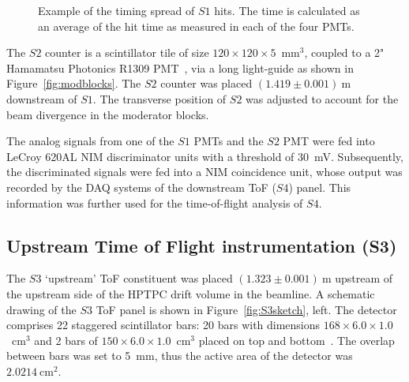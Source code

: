 \begin{figure}
  \begin{adjustbox}{width=0.7\linewidth, center}
    
  \end{adjustbox}
  \caption{Example of the timing spread of $\mathit{S1}$ hits. The time is calculated as an average of the hit time as measured in each of the four PMTs.}
  \label{fig:s1Res}
\end{figure}

The $\mathit{S2}$ counter is a scintillator tile of size $120\times120\times5$~mm$^3$, coupled to a 2" Hamamatsu Photonics R1309 PMT~\cite{Hamamatsu}, via a long light-guide as shown in Figure~\ref{fig:modblocks}.
The $\mathit{S2}$ counter was placed $(1.419 \pm 0.001)~\text{m}$ downstream of $\mathit{S1}$.
The transverse position of $\mathit{S2}$ was adjusted to account for the beam divergence in the moderator blocks.

The analog signals from one of the $\mathit{S1}$ PMTs and the $\mathit{S2}$ PMT were fed into LeCroy 620AL NIM discriminator units with a threshold of 30~mV.
Subsequently, the discriminated signals were fed into a NIM coincidence unit, whose output was recorded by the DAQ systems of the downstream ToF ($\mathit{S4}$) panel.
This information was further used for the time-of-flight analysis of $\mathit{S4}$.

\subsection{Upstream Time of Flight instrumentation (S3)}
\label{subsec:s3Exp}
The $\mathit{S3}$ `upstream' ToF constituent was placed $(1.323 \pm 0.001)~\text{m}$ upstream of the upstream side of the HPTPC drift volume in the beamline.
A schematic drawing of the $\mathit{S3}$ ToF panel is shown in Figure~\ref{fig:S3sketch}, left.
The detector comprises 22 staggered scintillator bars:  20 bars with dimensions $168 \times 6.0 \times 1.0$~cm$^3$ and 2 bars of  $150 \times 6.0 \times 1.0$~cm$^3$ placed on top and bottom~\cite{S3-proceedings}.
The overlap between bars was set to 5~mm, thus the active area of the detector was $2.0214~\text{cm}^{2}$.

